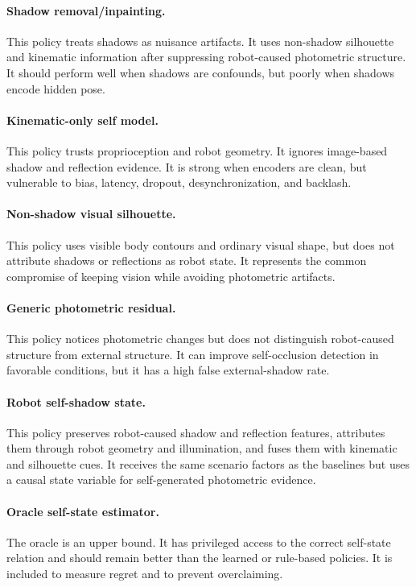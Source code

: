 \documentclass{article}
\begin{document}
\paragraph{Shadow removal/inpainting.}
This policy treats shadows as nuisance artifacts. It uses non-shadow silhouette and kinematic information after suppressing robot-caused photometric structure. It should perform well when shadows are confounds, but poorly when shadows encode hidden pose.

\paragraph{Kinematic-only self model.}
This policy trusts proprioception and robot geometry. It ignores image-based shadow and reflection evidence. It is strong when encoders are clean, but vulnerable to bias, latency, dropout, desynchronization, and backlash.

\paragraph{Non-shadow visual silhouette.}
This policy uses visible body contours and ordinary visual shape, but does not attribute shadows or reflections as robot state. It represents the common compromise of keeping vision while avoiding photometric artifacts.

\paragraph{Generic photometric residual.}
This policy notices photometric changes but does not distinguish robot-caused structure from external structure. It can improve self-occlusion detection in favorable conditions, but it has a high false external-shadow rate.

\paragraph{Robot self-shadow state.}
This policy preserves robot-caused shadow and reflection features, attributes them through robot geometry and illumination, and fuses them with kinematic and silhouette cues. It receives the same scenario factors as the baselines but uses a causal state variable for self-generated photometric evidence.

\paragraph{Oracle self-state estimator.}
The oracle is an upper bound. It has privileged access to the correct self-state relation and should remain better than the learned or rule-based policies. It is included to measure regret and to prevent overclaiming.
\end{document}
